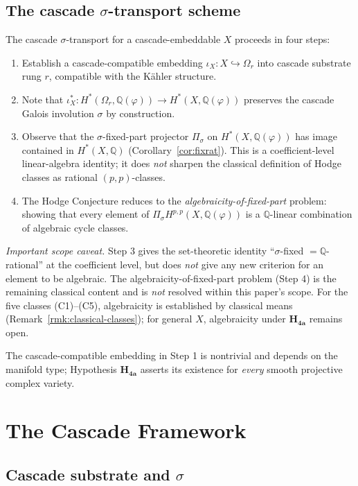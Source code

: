 \documentclass[11pt, a4paper]{amsart}
\theoremstyle{definition}
\newcommand{\Q}{\mathbb{Q}}
\begin{document}
\subsection{The cascade $\sigma$-transport scheme}

The cascade $\sigma$-transport for a cascade-embeddable $X$
proceeds in four steps:
\begin{enumerate}
\item Establish a cascade-compatible embedding $\iota_X: X
    \hookrightarrow \Omega_r$ into cascade substrate rung $r$,
    compatible with the Kähler structure.
\item Note that $\iota_X^*: H^*(\Omega_r, \Q(\varphi)) \to H^*(X,
    \Q(\varphi))$ preserves the cascade Galois involution $\sigma$
    by construction.
\item Observe that the $\sigma$-fixed-part projector $\Pi_\sigma$
    on $H^*(X, \Q(\varphi))$ has image contained in $H^*(X,
    \Q)$ (Corollary~\ref{cor:fixrat}). This is a coefficient-level
    linear-algebra identity; it does \emph{not} sharpen the
    classical definition of Hodge classes as rational
    $(p, p)$-classes.
\item The Hodge Conjecture reduces to the
    \emph{algebraicity-of-fixed-part} problem: showing that every
    element of $\Pi_\sigma H^{p, p}(X, \Q(\varphi))$ is a
    $\Q$-linear combination of algebraic cycle classes.
\end{enumerate}

\emph{Important scope caveat.} Step 3 gives the set-theoretic
identity ``$\sigma$-fixed $= \Q$-rational'' at the coefficient
level, but does \emph{not} give any new criterion for an element
to be algebraic. The algebraicity-of-fixed-part problem (Step 4)
is the remaining classical content and is \emph{not} resolved
within this paper's scope. For the five classes (C1)--(C5),
algebraicity is established by classical means
(Remark~\ref{rmk:classical-classes}); for general $X$,
algebraicity under $\mathbf{H_{4a}}$ remains open.

The cascade-compatible embedding in Step 1 is nontrivial and
depends on the manifold type; Hypothesis $\mathbf{H_{4a}}$
asserts its existence for \emph{every} smooth projective complex
variety.

\section{The Cascade Framework}

\subsection{Cascade substrate and $\sigma$}
\end{document}
